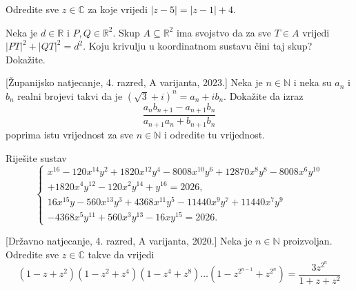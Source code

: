 \begin{exercise}{\unskip}
Odredite sve \(z\in \mathbb{C}\) za koje vrijedi \(|z-5|=|z-1|+4\).
\end{exercise}
\begin{exercise}{\unskip}
Neka je \(d\in \mathbb{R}\) i \(P, Q\in \mathbb{R}^2\). Skup \(A\subseteq \mathbb{R}^2\) ima svojstvo da za sve \(T\in A\) vrijedi \(|PT|^2+|QT|^2=d^2\). Koju krivulju u koordinatnom sustavu čini taj skup? Dokažite.
\end{exercise}
\begin{exercise}{\unskip}[Županijsko natjecanje, 4. razred, A varijanta, 2023.]
Neka je \(n\in \mathbb{N}\) i neka su \(a_n\) i \(b_n\) realni brojevi takvi da je \((\sqrt{3}+i)^n=a_n+ib_n\). Dokažite da izraz
\[\dfrac{a_nb_{n+1}-a_{n+1}b_n}{a_{n+1}a_n+b_{n+1}b_n}\]
poprima istu vrijednost za sve \(n\in \mathbb{N}\) i odredite tu vrijednost.
\end{exercise}
\begin{exercise}{\unskip}
Riješite sustav
\[\begin{cases}
x^{16}-120x^{14}y^2+1820x^{12}y^4-8008x^{10}y^6+12870x^8y^8-8008x^6y^{10}\\
+1820x^4y^{12}-120x^2y^{14}+y^{16}=2026,\\
16x^{15}y-560x^{13}y^3+4368x^{11}y^5-11440x^9y^7+11440x^7y^9\\
-4368x^5y^{11}+560x^3y^{13}-16xy^{15}=2026.
\end{cases}\]
\end{exercise}
\begin{exercise}{\unskip}[Državno natjecanje, 4. razred, A varijanta, 2020.]
Neka je \(n\in \mathbb{N}\) proizvoljan. Odredite sve \(z\in \mathbb{C}\) takve da vrijedi
\[\left(1-z+z^2\right)\left(1-z^2+z^4\right)\left(1-z^4+z^8\right)\dots\left(1-z^{2^{n-1}}+z^{2^n}\right)=\dfrac{3z^{2^n}}{1+z+z^2}\]
\end{exercise}